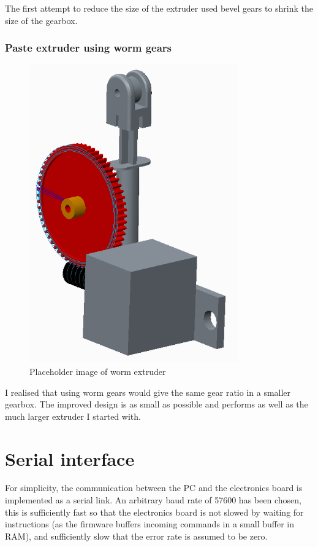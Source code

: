 \documentclass[a4paper,11pt]{article}  %
\begin{document}
The first attempt to reduce the size of the extruder used bevel gears to shrink the size of the gearbox. 

\subsubsection{Paste extruder using worm gears}
\begin{figure}[ht!]
\centering
\includegraphics[width=90mm]{resources/extruder_worm.png}
\caption{Placeholder image of worm extruder}
\label{overflow}
\end{figure}

I realised that using worm gears would give the same gear ratio in a smaller gearbox. The improved design is as small as possible and performs as well as the much larger extruder I started with.

\section{Serial interface}
For simplicity, the communication between the PC and the electronics board is implemented as a serial link. An arbitrary baud rate of 57600 has been
chosen, this is sufficiently fast so that the electronics board is not slowed by waiting for instructions (as the firmware buffers incoming commands in
a small buffer in RAM), and sufficiently slow that the error rate is assumed to be zero.
\end{document}
